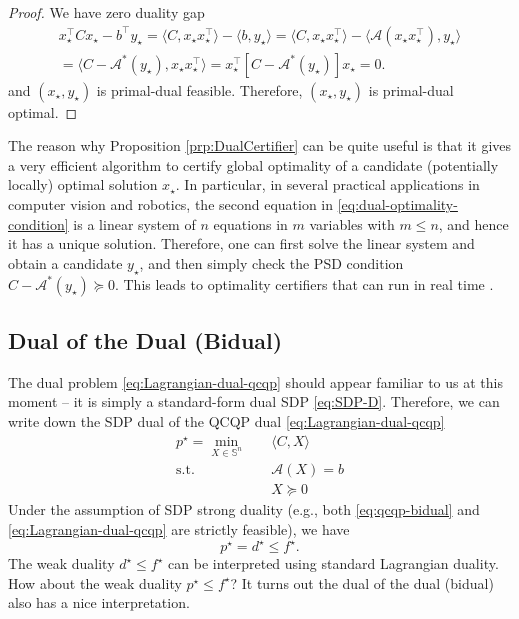\documentclass[
]{book}
\theoremstyle{definition}
\theoremstyle{definition}
\theoremstyle{definition}
\theoremstyle{definition}
\theoremstyle{remark}
\begin{document}
\begin{proof}
We have zero duality gap
\begin{equation}
\begin{split}
x_\star^\top C x_\star - b^\top y_\star = \langle C, x_\star x_\star^\top \rangle - \langle b, y_\star \rangle = \langle C, x_\star x_\star^\top \rangle - \langle \mathcal{A}(x_\star x_\star^\top), y_\star \rangle \\
= \langle C - \mathcal{A}^*(y_\star),  x_\star x_\star^\top \rangle = x_\star^\top[ C - \mathcal{A}^*(y_\star) ] x_\star = 0.
\end{split}
\end{equation}
and \((x_\star, y_\star)\) is primal-dual feasible. Therefore, \((x_\star, y_\star)\) is primal-dual optimal.
\end{proof}

The reason why Proposition \ref{prp:DualCertifier} can be quite useful is that it gives a very efficient algorithm to certify global optimality of a candidate (potentially locally) optimal solution \(x_\star\). In particular, in several practical applications in computer vision and robotics, the second equation in \eqref{eq:dual-optimality-condition} is a linear system of \(n\) equations in \(m\) variables with \(m\leq n\), and hence it has a unique solution. Therefore, one can first solve the linear system and obtain a candidate \(y_\star\), and then simply check the PSD condition \(C - \mathcal{A}^*(y_\star) \succeq 0\). This leads to optimality certifiers that can run in real time \citep{garcia21ivc-certifiable} \citep{holmes23ral-efficient}.

\hypertarget{dual-of-the-dual-bidual}{%
\subsection{Dual of the Dual (Bidual)}\label{dual-of-the-dual-bidual}}

The dual problem \eqref{eq:Lagrangian-dual-qcqp} should appear familiar to us at this moment -- it is simply a standard-form dual SDP \eqref{eq:SDP-D}. Therefore, we can write down the SDP dual of the QCQP dual \eqref{eq:Lagrangian-dual-qcqp}
\begin{equation}
\begin{split}
p^\star = \min_{X \in \mathbb{S}^{n}} & \quad \langle C, X \rangle \\
\mathrm{s.t.}& \quad \mathcal{A}(X) = b \\
& \quad X \succeq 0
\end{split}
\label{eq:qcqp-bidual}
\end{equation}
Under the assumption of SDP strong duality (e.g., both \eqref{eq:qcqp-bidual} and \eqref{eq:Lagrangian-dual-qcqp} are strictly feasible), we have
\[
p^\star = d^\star \leq f^\star.
\]
The weak duality \(d^\star \leq f^\star\) can be interpreted using standard Lagrangian duality. How about the weak duality \(p^\star \leq f^\star\)?
It turns out the dual of the dual (bidual) also has a nice interpretation.
\end{document}
